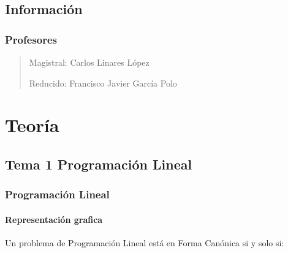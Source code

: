 \documentclass[12pt, twoside, openright]{report} %
\begin{document}
\listoffigures
\thispagestyle{fancy}





\chapter{Información}
\section{Profesores}
\begin{quote}
Magistral: Carlos Linares López 

Reducido: Francisco Javier García Polo
  \end{quote}










\part{Teoría}




  \chapter{Tema 1 Programación Lineal}

  \section{Programación Lineal}

  \subsection{Representación grafica}


    Un problema de Programación Lineal está en Forma Canónica si y solo
    si:
\end{document}
